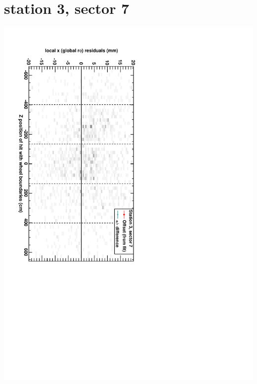 \documentclass[compress]{beamer}
\begin{document}
\section*{station 3, sector 7}
\begin{frame} \vfill \mbox{\hspace{-1 cm}\includegraphics[height=1.2\linewidth, angle=90]{DTrphiVsZ_st3_sr07.pdf}} \end{frame}
\end{document}
